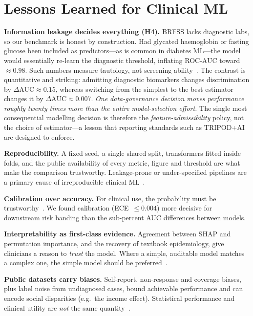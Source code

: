 \documentclass[conference]{IEEEtran}
\begin{document}
\section{Lessons Learned for Clinical ML}
\label{sec:lessons}
\textbf{Information leakage decides everything (H4).} BRFSS lacks diagnostic labs, so our
benchmark is honest by construction. Had glycated haemoglobin or fasting glucose been
included as predictors---as is common in diabetes ML---the model would essentially
re-learn the diagnostic threshold, inflating ROC-AUC toward $\approx0.98$. Such numbers
measure tautology, not screening ability~\cite{kaufman2012leakage,kapoor2023leakage}.
The contrast is quantitative and striking: admitting diagnostic biomarkers changes
discrimination by $\Delta\text{AUC}\approx0.15$, whereas switching from the simplest to
the best estimator changes it by $\Delta\text{AUC}\approx0.007$. \emph{One
data-governance decision moves performance roughly twenty times more than the entire
model-selection effort.} The single most consequential modelling decision is therefore the
\emph{feature-admissibility} policy, not the choice of estimator---a lesson that
reporting standards such as TRIPOD+AI~\cite{collins2024tripod} are designed to enforce.

\textbf{Reproducibility.} A fixed seed, a single shared split, transformers fitted inside
folds, and the public availability of every metric, figure and threshold are what make
the comparison trustworthy. Leakage-prone or under-specified pipelines are a primary
cause of irreproducible clinical ML~\cite{kapoor2023leakage}.

\textbf{Calibration over accuracy.} For clinical use, the probability must be
trustworthy~\cite{niculescu2005predicting,guo2017calibration}. We found calibration
(ECE~$\le0.004$) more decisive for downstream risk banding than the sub-percent AUC
differences between models.

\textbf{Interpretability as first-class evidence.} Agreement between SHAP and permutation
importance, and the recovery of textbook epidemiology, give clinicians a reason to
\emph{trust} the model. Where a simple, auditable model matches a complex one, the simple
model should be preferred~\cite{rudin2019stop,caruana2015intelligible}.

\textbf{Public datasets carry biases.} Self-report, non-response and coverage biases, plus
label noise from undiagnosed cases, bound achievable performance and can encode social
disparities (e.g.\ the income effect). Statistical performance and clinical utility are
\emph{not} the same quantity~\cite{vancalster2019calibration,steyerberg2019validation}.
\end{document}
